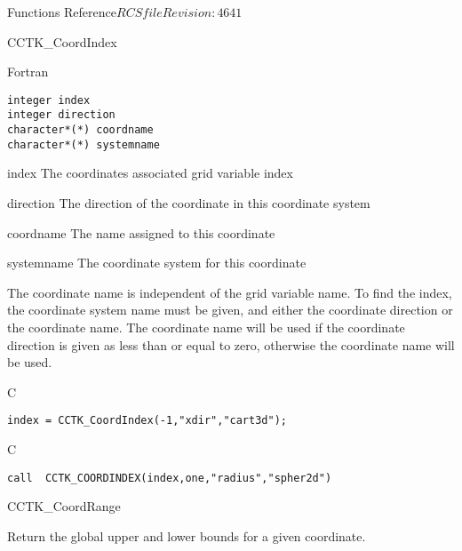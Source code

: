 \begin{cactuspart}{ Functions Reference}{$RCSfile$}{$Revision: 4641 $}
\begin{FunctionDescription}{CCTK\_CoordIndex}
\begin{SynopsisSection}
\begin{Synopsis}{Fortran}
\begin{verbatim}
integer index
integer direction
character*(*) coordname
character*(*) systemname\end{verbatim}
\end{Synopsis}
\end{SynopsisSection}
\begin{ParameterSection}
\begin{Parameter}{index}
The coordinates associated grid variable index
\end{Parameter}
\begin{Parameter}{direction}
The direction of the coordinate in this coordinate system
\end{Parameter}
\begin{Parameter}{coordname}
The name assigned to this coordinate
\end{Parameter}
\begin{Parameter}{systemname}
The coordinate system for this coordinate
\end{Parameter}
\end{ParameterSection}
\begin{Discussion}
The coordinate name is independent of the grid variable name.
To find the index, the coordinate system name must be given, and either
the coordinate direction or the coordinate name. The coordinate name
will be used if the coordinate direction is given as less than or equal to zero, otherwise the coordinate name will be used.
\end{Discussion}
\begin{ExampleSection}
\begin{Example}{C}
\begin{verbatim}
index = CCTK_CoordIndex(-1,"xdir","cart3d");
\end{verbatim}
\end{Example}
\begin{Example}{C}
\begin{verbatim}call  CCTK_COORDINDEX(index,one,"radius","spher2d")
\end{verbatim}
\end{Example}
\end{ExampleSection}
\end{FunctionDescription}


\begin{FunctionDescription}{CCTK\_CoordRange}%
{Return the global upper and lower bounds for a given coordinate.

}
\end{FunctionDescription}
\end{cactuspart}
